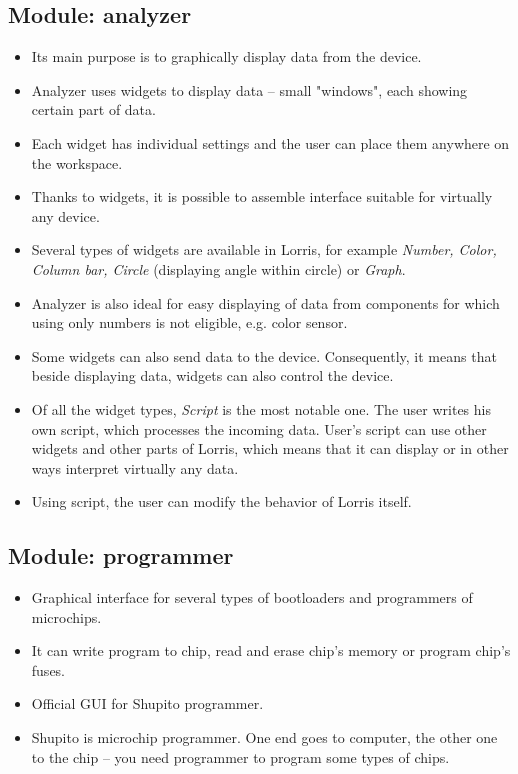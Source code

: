\documentclass[12pt, a4paper, oneside]{article}
\newcommand{\It}{\textit}  %
\begin{document}
\subsection*{Module: analyzer}
\begin{itemize}
    \item Its main purpose is to graphically display data from the device.
    \item Analyzer uses widgets to display data -- small "windows", each showing certain part of data.
    \item Each widget has individual settings and the user can place them anywhere on the workspace.
    \item Thanks to widgets, it is possible to assemble interface suitable for virtually any device.
    \item Several types of widgets are available in Lorris, for example \It{Number, Color, Column bar, Circle} (displaying angle within circle) or \It{Graph}.
    \item Analyzer is also ideal for easy displaying of data from components for which using only numbers is not eligible, e.g. color sensor.
    \item Some widgets can also send data to the device. Consequently, it means that beside displaying data, widgets can also control the device.
    \item Of all the widget types, \It{Script} is the most notable one. The user writes his own script, which processes the incoming data. User's script can use other widgets and other parts of Lorris, which means that it can display or in other ways interpret virtually any data.
    \item Using script, the user can modify the behavior of Lorris itself.
\end{itemize}

\subsection*{Module: programmer}
\begin{itemize}
    \item Graphical interface for several types of bootloaders and programmers of microchips.
    \item It can write program to chip, read and erase chip's memory or program chip's fuses.
    \item Official GUI for Shupito programmer.
    \item Shupito is microchip programmer. One end goes to computer, the other one to the chip -- you need programmer to program some types of chips.
\end{itemize}
\end{document}
